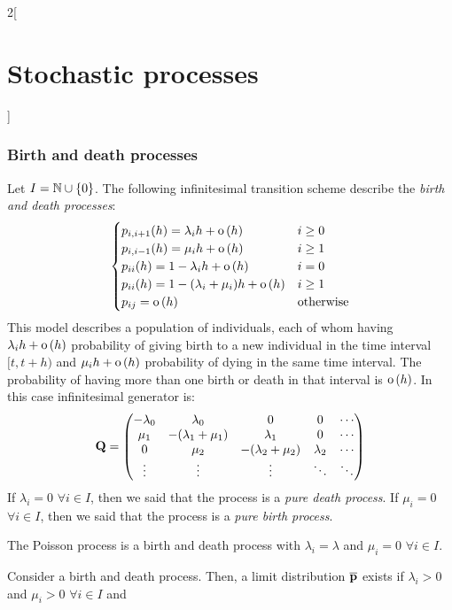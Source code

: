 \documentclass[../../../main_math.tex]{subfiles}
\begin{document}
\begin{multicols}{2}[\section{Stochastic processes}]
  \subsubsection{Birth and death processes}
  \begin{definition}
    Let $I=\mathbb{N}\cup\{0\}$. The following infinitesimal transition scheme describe the \emph{birth and death processes}:
    $$
      \begin{cases}
        p_{i,i+1}(h)=\lambda_i h+\mathrm{o}\left(h\right)       & i\geq 0          \\
        p_{i,i-1}(h)=\mu_i h+\mathrm{o}\left(h\right)           & i\geq 1          \\
        p_{ii}(h)=1-\lambda_ih+\mathrm{o}\left(h\right)         & i=0              \\
        p_{ii}(h)=1-(\lambda_i+\mu_i)h+\mathrm{o}\left(h\right) & i\geq 1          \\
        p_{ij} = \mathrm{o}\left(h\right)                       & \text{otherwise}
      \end{cases}
    $$
    This model describes a population of individuals, each of whom having $\lambda_i h + \mathrm{o}\left(h\right)$ probability of giving birth to a new individual in the time interval $[t,t+h)$ and $\mu_i h + \mathrm{o}\left(h\right)$ probability of dying in the same time interval. The probability of having more than one birth or death in that interval is $\mathrm{o}\left(h\right)$. In this case infinitesimal generator is:
    $$
      \boldsymbol{\mathrm{Q}}=\begin{pmatrix}
        -\lambda_0 & \lambda_0          & 0                  & 0         & \cdots \\
        \mu_1      & -(\lambda_1+\mu_1) & \lambda_1          & 0         & \cdots \\
        0          & \mu_2              & -(\lambda_2+\mu_2) & \lambda_2 & \cdots \\
        \vdots     & \vdots             & \vdots             & \ddots    & \ddots
      \end{pmatrix}
    $$
    If $\lambda_i=0$ $\forall i\in I$, then we said that the process is a \emph{pure death process}. If $\mu_i=0$ $\forall i\in I$, then we said that the process is a \emph{pure birth process}.
  \end{definition}
  \begin{proposition}
    The Poisson process is a birth and death process with $\lambda_i=\lambda$ and $\mu_i=0$ $\forall i\in I$.
  \end{proposition}
  \begin{theorem}
    Consider a birth and death process. Then, a limit distribution $\boldsymbol{\mathrm{\overline{p}}}$ exists if $\lambda_i>0$ and $\mu_i>0$ $\forall i\in I$ and

\end{theorem}
\end{multicols}
\end{document}
